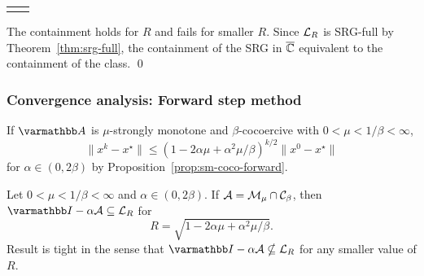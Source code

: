 \documentclass[10pt,mathserif]{beamer}
\begin{document}
\begin{frame}
\begin{center}
\begin{tabular}{cc}
{\begin{tikzpicture}[scale=1.5]
\end{tikzpicture}
}
\end{tabular}
\end{center}


The containment holds for $R$ and fails for smaller $R$.
Since ${\mathcal{L}}_R$ is SRG-full by Theorem~\ref{thm:srg-full}, the containment of the SRG in $\overline{\mathbb{C}}$ equivalent to the containment of the class.
\qed
\end{frame}

\begin{frame}
\frametitle{Convergence analysis: Forward step method}


If $\opA$ is $\mu$-strongly monotone and $\beta$-cocoercive with $0<\mu<1/\beta<\infty$,
\[
\|x^k-x^\star\|\le
\left(1-2\alpha\mu+\alpha^2\mu/\beta\right)^{k/2}
\|x^0-x^\star\|
\]
for $\alpha\in (0,2\beta)$ by Proposition~\ref{prop:sm-coco-forward}.

\vspace{0.2in}


\begin{proposition}
\label{prop:sm-coco-forward}
Let $0<\mu<1/\beta<\infty$ and $\alpha\in (0,2\beta)$.
If ${\mathcal{A}}=\mathcal{M}_\mu\cap \mathcal{C}_\beta$, then $\opI-\alpha \cA\subseteq \cL_R$ for
\[
R= \sqrt{1-2\alpha\mu+\alpha^2\mu/\beta}.
\]
Result is tight in the sense that $\opI-\alpha\cA\nsubseteq \cL_R$ for any smaller value of $R$.
\end{proposition}
\end{frame}
\end{document}
